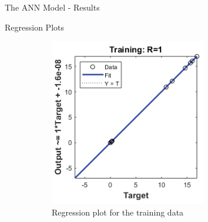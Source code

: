 \documentclass{beamer}
\begin{document}
\begin{frame}{The ANN Model - Results}
    \begin{block}{Regression Plots}
    \begin{figure}
         \centering
         \begin{subfigure}[b]{0.23\textwidth}
             \centering
             \includegraphics[width=\textwidth]{Figures/Regression-training.png}
             \caption{\centering Regression plot for the training data}
         \end{subfigure}
         \hfill
         \begin{subfigure}[b]{0.23\textwidth}
             \centering

\end{subfigure}
\end{figure}
\end{block}
\end{frame}
\end{document}
